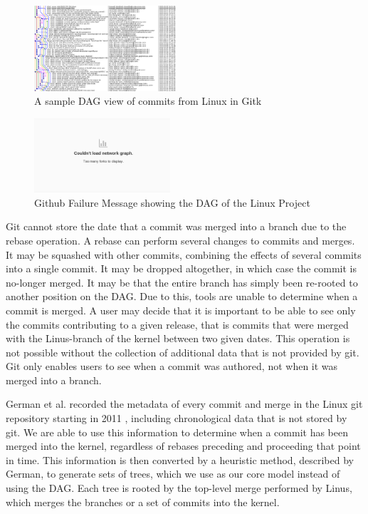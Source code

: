 \documentclass[conference, draftclsnofoot, draft]{IEEEtran}
\begin{document}
\begin{figure}
        \centering
        \includegraphics[width=0.47\textwidth]{figures/gitk.png}
        \caption{A sample DAG view of commits from Linux in Gitk}
        \label{fig:gitk}
\end{figure}

\begin{figure}
        \centering
        \includegraphics[width=0.45\textwidth]{figures/github_viewer.png}
        \caption{Github Failure Message showing the DAG of the Linux Project}
        \label{fig:gitfail}
\end{figure}


Git cannot store the date that a commit was merged into a branch due to the rebase
operation. A rebase can perform several changes to commits and merges. It may be
squashed with other commits, combining the effects of several commits into a single
commit. It may be dropped altogether, in which case the commit is no-longer merged.
It may be that the entire branch has simply been re-rooted to another position on
the DAG. Due to this, tools are unable to determine when a commit is merged. A user
may decide that it is important to be able to see only the commits contributing to a
given release, that is commits that were merged with the Linus-branch of the kernel
between two given dates. This operation is not possible without the collection of
additional data that is not provided by git. Git only enables users to see when a
commit was authored, not when it was merged into a branch.

German et al. recorded the metadata of every commit and merge in the Linux git
repository starting in 2011 \cite{German2015}, including chronological data that is
not stored by git. We are able to use this information to determine when a commit
has been merged into the kernel, regardless of rebases preceding and proceeding that
point in time. This information is then converted by a heuristic method, described
by German, to generate sets of trees, which we use as our core model instead of
using the DAG. Each tree is rooted by the top-level merge performed by Linus, which
merges the branches or a set of commits into the kernel.
\end{document}
